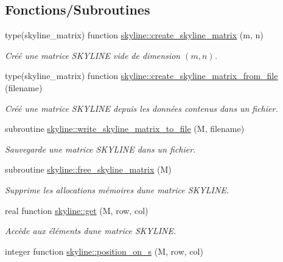 \subsection*{Fonctions/\+Subroutines}
\begin{DoxyCompactItemize}
\item 
type(skyline\+\_\+matrix) function \hyperlink{namespaceskyline_a5fe1d351df2e3a07f96028d1d2a892a8}{skyline\+::create\+\_\+skyline\+\_\+matrix} (m, n)
\begin{DoxyCompactList}\small\item\em Créé une matrice S\+K\+Y\+L\+I\+NE vide de dimension $(m,n)$. \end{DoxyCompactList}\item 
type(skyline\+\_\+matrix) function \hyperlink{namespaceskyline_a86a4fe28bc106ef42d25cf7596c108bf}{skyline\+::create\+\_\+skyline\+\_\+matrix\+\_\+from\+\_\+file} (filename)
\begin{DoxyCompactList}\small\item\em Créé une matrice S\+K\+Y\+L\+I\+NE depuis les données contenus dans un fichier. \end{DoxyCompactList}\item 
subroutine \hyperlink{namespaceskyline_a3377a8391ad2d61659689fc8c4130bdc}{skyline\+::write\+\_\+skyline\+\_\+matrix\+\_\+to\+\_\+file} (M, filename)
\begin{DoxyCompactList}\small\item\em Sauvegarde une matrice S\+K\+Y\+L\+I\+NE dans un fichier. \end{DoxyCompactList}\item 
subroutine \hyperlink{namespaceskyline_a583c70b26e3bcb37ecb679f5c11ec2f4}{skyline\+::free\+\_\+skyline\+\_\+matrix} (M)
\begin{DoxyCompactList}\small\item\em Supprime les allocations mémoires d\textquotesingle{}une matrice S\+K\+Y\+L\+I\+NE. \end{DoxyCompactList}\item 
real function \hyperlink{namespaceskyline_a28077ec6714b830771f90da1b674b0ce}{skyline\+::get} (M, row, col)
\begin{DoxyCompactList}\small\item\em Accède aux éléments d\textquotesingle{}une matrice S\+K\+Y\+L\+I\+NE. \end{DoxyCompactList}\item 
integer function \hyperlink{namespaceskyline_a25b1e027d99abb67ab844d7b657a5843}{skyline\+::position\+\_\+on\+\_\+s} (M, row, col)

\end{DoxyCompactItemize}

